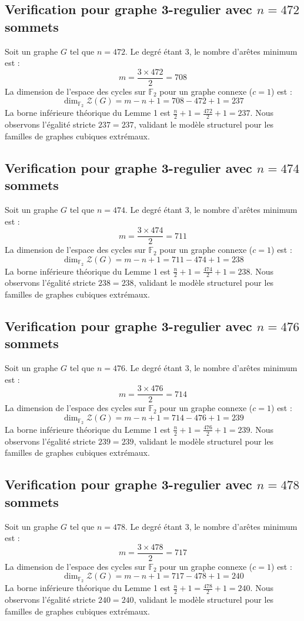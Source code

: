 \documentclass[11pt,a4paper]{article}
\begin{document}
\subsection{Verification pour graphe 3-regulier avec $n=472$ sommets}
Soit un graphe $G$ tel que $n = 472$. Le degré étant 3, le nombre d'arêtes minimum est :
$$ m = \frac{3 \times 472}{2} = 708 $$
La dimension de l'espace des cycles sur $\mathbb{F}_2$ pour un graphe connexe ($c=1$) est :
$$ \dim_{\mathbb{F}_2} \mathcal{Z}(G) = m - n + 1 = 708 - 472 + 1 = 237 $$
La borne inférieure théorique du Lemme 1 est $\frac{n}{2} + 1 = \frac{472}{2} + 1 = 237$.
Nous observons l'égalité stricte $237 = 237$, validant le modèle structurel pour les familles de graphes cubiques extrémaux.

\subsection{Verification pour graphe 3-regulier avec $n=474$ sommets}
Soit un graphe $G$ tel que $n = 474$. Le degré étant 3, le nombre d'arêtes minimum est :
$$ m = \frac{3 \times 474}{2} = 711 $$
La dimension de l'espace des cycles sur $\mathbb{F}_2$ pour un graphe connexe ($c=1$) est :
$$ \dim_{\mathbb{F}_2} \mathcal{Z}(G) = m - n + 1 = 711 - 474 + 1 = 238 $$
La borne inférieure théorique du Lemme 1 est $\frac{n}{2} + 1 = \frac{474}{2} + 1 = 238$.
Nous observons l'égalité stricte $238 = 238$, validant le modèle structurel pour les familles de graphes cubiques extrémaux.

\subsection{Verification pour graphe 3-regulier avec $n=476$ sommets}
Soit un graphe $G$ tel que $n = 476$. Le degré étant 3, le nombre d'arêtes minimum est :
$$ m = \frac{3 \times 476}{2} = 714 $$
La dimension de l'espace des cycles sur $\mathbb{F}_2$ pour un graphe connexe ($c=1$) est :
$$ \dim_{\mathbb{F}_2} \mathcal{Z}(G) = m - n + 1 = 714 - 476 + 1 = 239 $$
La borne inférieure théorique du Lemme 1 est $\frac{n}{2} + 1 = \frac{476}{2} + 1 = 239$.
Nous observons l'égalité stricte $239 = 239$, validant le modèle structurel pour les familles de graphes cubiques extrémaux.

\subsection{Verification pour graphe 3-regulier avec $n=478$ sommets}
Soit un graphe $G$ tel que $n = 478$. Le degré étant 3, le nombre d'arêtes minimum est :
$$ m = \frac{3 \times 478}{2} = 717 $$
La dimension de l'espace des cycles sur $\mathbb{F}_2$ pour un graphe connexe ($c=1$) est :
$$ \dim_{\mathbb{F}_2} \mathcal{Z}(G) = m - n + 1 = 717 - 478 + 1 = 240 $$
La borne inférieure théorique du Lemme 1 est $\frac{n}{2} + 1 = \frac{478}{2} + 1 = 240$.
Nous observons l'égalité stricte $240 = 240$, validant le modèle structurel pour les familles de graphes cubiques extrémaux.
\end{document}
